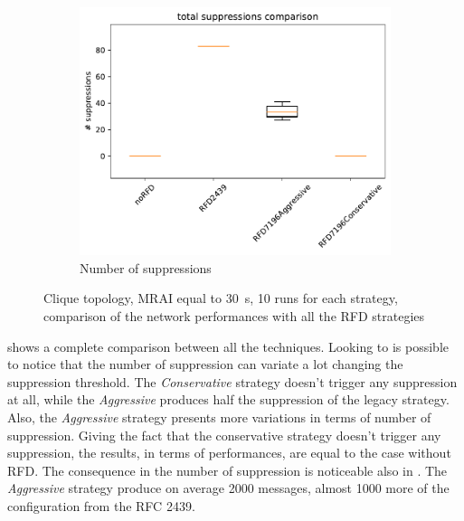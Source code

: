 \begin{figure}[h]
\begin{subfigure}[b]{0.49\textwidth}
     \end{subfigure}
     \hfill
     \begin{subfigure}[b]{0.49\textwidth}
         \centering
         \includegraphics[width=\textwidth]{images/RFD/clique/clique_rfd_comparison_suppressions_boxplot.pdf}
         \caption{Number of suppressions}
         \label{fig:RFD_clique_MRAI30_suppressions}
     \end{subfigure}
		\caption{Clique topology, \ac{MRAI} equal to \SI{30}{\second}, \num{10}
				runs for each strategy,
				comparison of the network performances with all the \ac{RFD} strategies}
        \label{fig:RFD_MRAI30}
\end{figure}

 shows a complete comparison between all
the techniques.
Looking to  is possible to notice that
the number of suppression can variate a lot changing the suppression threshold.
The \textit{Conservative} strategy doesn't trigger any suppression at all, while
the \textit{Aggressive} produces half the suppression of the legacy strategy.
Also, the \textit{Aggressive} strategy presents more variations in terms of
number of suppression.
Giving the fact that the conservative strategy doesn't trigger any suppression,
the results, in terms of performances, are equal to the case without \ac{RFD}.
The consequence in the number of suppression is noticeable also in
.
The \textit{Aggressive} strategy produce on average \num{2000} messages, almost
\num{1000} more of the configuration from the \ac{RFC} \num{2439}.

